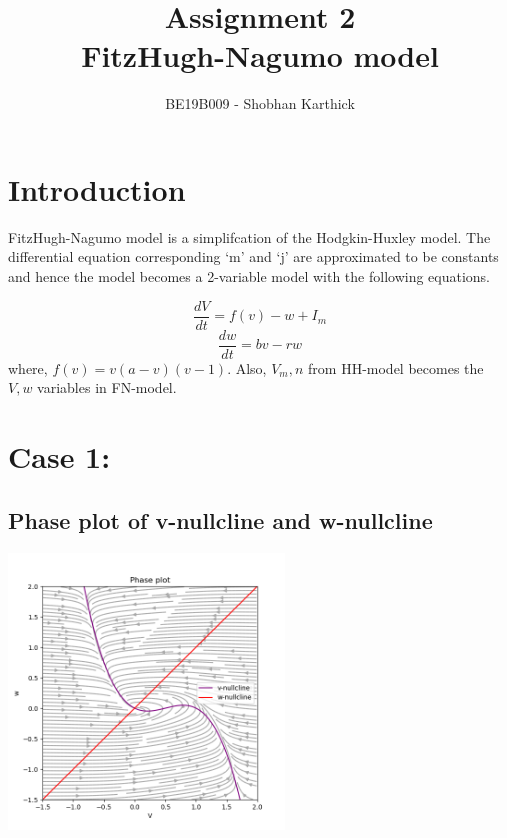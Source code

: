 \documentclass[a4paper, 12pt]{article}
\author{BE19B009 - Shobhan Karthick}
\title{Assignment 2 \\ FitzHugh-Nagumo model}
\date{}
\begin{document}
  

\maketitle

\section{Introduction}
\label{Intro}

FitzHugh-Nagumo model is a simplifcation of the Hodgkin-Huxley model. The differential equation corresponding `m' and `j' are approximated to be constants and hence the model becomes a 2-variable model with the following equations.

$$ \frac{dV}{dt} = f(v) - w + I_m $$
$$ \frac{dw}{dt} = bv - rw $$
where, $ f(v) = v(a - v)(v - 1) $. Also, $ V_m, n $ from HH-model becomes the $ V, w $ variables in FN-model.

\section{Case 1: }
\label{case_1}
\subsection{Phase plot of v-nullcline and w-nullcline}

\begin{center}
    \begin{minipage}{\linewidth}
    \centering
    \includegraphics[width=0.55\textwidth]{Q1_a}
    \label{fig:Q1_a}
\end{minipage}
\end{center}
\end{document}
